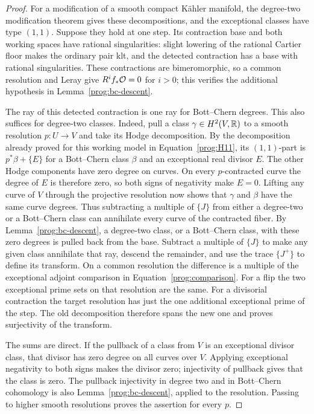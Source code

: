 \begin{proof}
For a modification of a smooth compact Kähler manifold, the
degree-two modification theorem gives these decompositions, and
the exceptional classes have type \((1,1)\).  Suppose they hold
at one step.  Its contraction base and both working spaces have
rational singularities: slight lowering of the rational Cartier
floor makes the ordinary pair klt, and the detected contraction has
a base with rational singularities.  These contractions are
bimeromorphic, so a common resolution and Leray give
\(R^if_*\mathcal O=0\) for \(i>0\); this verifies the additional
hypothesis in Lemma~\ref{prog:bc-descent}.

The ray of this detected contraction is one ray for Bott--Chern degrees.
This also suffices for degree-two classes.  Indeed, pull a class
\(\gamma\in H^2(V,\mathbb R)\) to a smooth resolution \(p:U\to V\)
and take its Hodge decomposition. By the decomposition already proved for
this working model in Equation~\eqref{prog:H11}, its \((1,1)\)-part is \(p^*\beta+\{E\}\) for a
Bott--Chern class \(\beta\) and an exceptional real divisor
\(E\).  The other Hodge components have zero degree on curves.
On every \(p\)-contracted curve the degree of \(E\) is therefore
zero, so both signs of negativity make \(E=0\).  Lifting any
curve of \(V\) through the projective resolution now shows that
\(\gamma\) and \(\beta\) have the same curve degrees.  Thus
subtracting a multiple of \(\{J\}\) from either a degree-two or
a Bott--Chern class can annihilate every curve of the contracted
fiber.  By
Lemma~\ref{prog:bc-descent}, a degree-two class, or a Bott--Chern class,
with these zero degrees is pulled back from the base.
Subtract a multiple of \(\{J\}\) to make any given class
annihilate that ray, descend the remainder, and use the trace
\(\{J^+\}\) to define its transform.  On a common resolution the
difference is a multiple of the exceptional adjoint comparison in
Equation~\eqref{prog:comparison}.  For a flip the two exceptional prime
sets on that resolution are the same.  For a divisorial
contraction the target resolution has just the one additional
exceptional prime of the step.  The old decomposition therefore
spans the new one and proves surjectivity of the transform.

The sums are direct.  If the pullback of a class from \(V\) is
an exceptional divisor class, that divisor has zero degree on
all curves over \(V\).  Applying exceptional negativity to both
signs makes the divisor zero; injectivity of pullback gives that
the class is zero.  The pullback injectivity in degree two and in
Bott--Chern cohomology is also
Lemma~\ref{prog:bc-descent}, applied to the resolution.  Passing to
higher smooth resolutions proves the assertion for every \(p\).


\end{proof}

